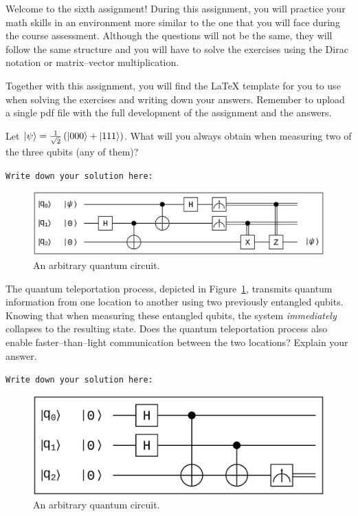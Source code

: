 Welcome to the sixth assignment! During this assignment, you will practice your
math skills in an environment more similar to the one that you will face during
the course assessment. Although the questions will not be the same, they will
follow the same structure and you will have to solve the exercises using the
Dirac notation or matrix--vector multiplication.

Together with this assignment, you will find the \LaTeX { template} for you to
use when solving the exercises and writing down your answers. Remember to
upload a single pdf file with the full development of the assignment and the
answers.

\begin{question}
Let $\ket{\psi} = \frac{1}{\sqrt{2}} \left( \ket{000} + \ket{111} \right)$. What will you always obtain when measuring two of the three qubits (any of them)?
\label{qst:assignment6_1}
\end{question}
{\small
\texttt{Write down your solution here:}}
\vspace{0.1cm}

\begin{figure}[t]
  \centerline{\includegraphics[scale=0.25]{img/qci_a6_question2.ps}}
  \caption{An arbitrary quantum circuit.}
  \label{fig:circuit1}
\end{figure}

\begin{question}
The quantum teleportation process, depicted in Figure~\ref{fig:circuit1}, transmits quantum information from one location to another using two previously entangled qubits. Knowing that when measuring these entangled qubits, the system \textit{immediately} collapses to the resulting state. Does the quantum teleportation process also enable faster--than--light communication between the two locations? Explain your answer.
\label{qst:assignment6_2}
\end{question}
{\small
\texttt{Write down your solution here:}}
\vspace{0.1cm}

\begin{figure}[t]
  \centerline{\includegraphics[scale=0.25]{img/qci_a6_question3.ps}}
  \caption{An arbitrary quantum circuit.}
  \label{fig:circuit2}
\end{figure}

